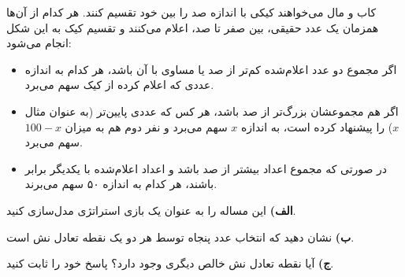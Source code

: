 کاب و مال می‌خواهند کیکی با اندازه صد را بین خود تقسیم کنند. هر کدام از آن‌ها همزمان یک عدد حقیقی، بین صفر تا صد، اعلام می‌کنند و تقسیم کیک به این شکل انجام می‌شود:
\begin{itemize}
    \item
    اگر مجموع دو عدد اعلام‌شده کم‌تر از صد یا مساوی با آن باشد، هر کدام به اندازه عددی که اعلام کرده از کیک سهم می‌برد.

    \item
    اگر هم مجموعشان بزرگ‌تر از صد باشد، هر کس که عددی پایین‌تر (به عنوان مثال $x$) را پیشنهاد کرده است، به اندازه $x$ سهم می‌برد و نفر دوم هم به میزان $100-x$ سهم می‌برد.

    \item
    در صورتی که مجموع اعداد بیشتر از صد باشد و اعداد اعلام‌شده با یکدیگر برابر باشند، هر کدام به اندازه ۵٠ سهم می‌برند.

\end{itemize}

\textbf{الف)}
این مساله را به عنوان یک بازی استراتژی مدل‌سازی کنید.
\vspace{5pt}

\textbf{ب)}
نشان دهید که انتخاب عدد پنجاه توسط هر دو یک نقطه تعادل نش است.
\vspace{5pt}

\textbf{ج)}
آیا نقطه تعادل نش خالص دیگری وجود دارد؟ پاسخ خود را ثابت کنید.
\vspace{5pt}